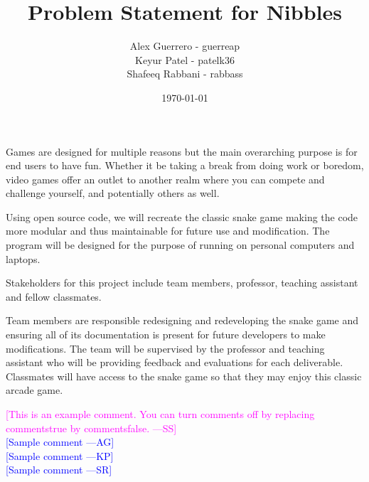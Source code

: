 \documentclass[12pt]{article}
\newcommand{\authornote}[3]{\textcolor{#1}{[#3 ---#2]}}
\newcommand{\authornote}[3]{}
\newcommand{\wss}[1]{\authornote{magenta}{SS}{#1}}
\newcommand{\ag}[1]{\authornote{blue}{AG}{#1}} %
\newcommand{\kp}[1]{\authornote{blue}{KP}{#1}} %
\newcommand{\sr}[1]{\authornote{blue}{SR}{#1}} %
\begin{document}
\title{Problem Statement for Nibbles} 
\author{Alex Guerrero - guerreap\\Keyur Patel - patelk36\\Shafeeq Rabbani - rabbass}
\date{\today}
	
\maketitle
	Games are designed for multiple reasons but the main overarching purpose is for end users to have fun. Whether it be taking a break from doing work or boredom, video games offer an outlet to another realm where you can compete and challenge yourself, and potentially others as well.\par

Using open source code, we will recreate the classic snake game making the code more modular and thus maintainable for future use and modification. The program will be designed for the purpose of running on personal computers and laptops.\par

Stakeholders for this project include team members, professor, teaching assistant and fellow classmates.\par 

Team members are responsible redesigning and redeveloping the snake game and ensuring all of its documentation is present for future developers to make modifications. The team will be supervised by the professor and teaching assistant who will be providing feedback and evaluations for each deliverable. Classmates will have access to the snake game so that they may enjoy this classic arcade game.\par


\noindent \wss{This is an example comment.  You can turn comments off by replacing
  commentstrue by commentsfalse.}\\
\ag{Sample comment}\\
\kp{Sample comment}\\
\sr{Sample comment}
\end{document}
